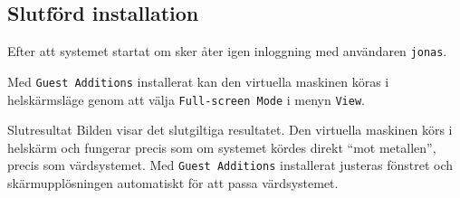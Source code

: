 \subsection{Slutförd installation}

           {}
           {Efter att systemet startat om sker åter igen inloggning med
            användaren \texttt{jonas}.}
           {}

           {}
           {Med \texttt{Guest Additions} installerat kan den virtuella maskinen
            köras i helskärmsläge genom att välja \texttt{Full-screen Mode} i 
            menyn \texttt{View}.}
           {}

           {Slutresultat}
           {Bilden visar det slutgiltiga resultatet. Den virtuella maskinen
            körs i helskärm och fungerar precis som om systemet kördes direkt
            ``mot metallen'', precis som värdsystemet. 
            Med \texttt{Guest Additions} installerat justeras fönstret och 
            skärmupplösningen automatiskt för att passa värdsystemet.}
           {}


